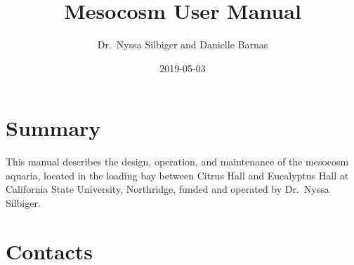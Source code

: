 \documentclass[]{book}
\title{Mesocosm User Manual}
\author{Dr.~Nyssa Silbiger and Danielle Barnas}
\date{2019-05-03}
\begin{document}
\maketitle

{
\setcounter{tocdepth}{1}
\tableofcontents
}
\chapter{Summary}\label{summary}

This manual describes the design, operation, and maintenance of the
mesocosm aquaria, located in the loading bay between Citrus Hall and
Eucalyptus Hall at California State University, Northridge, funded and
operated by Dr.~Nyssa Silbiger.

\chapter{Contacts}\label{contacts}
\end{document}

